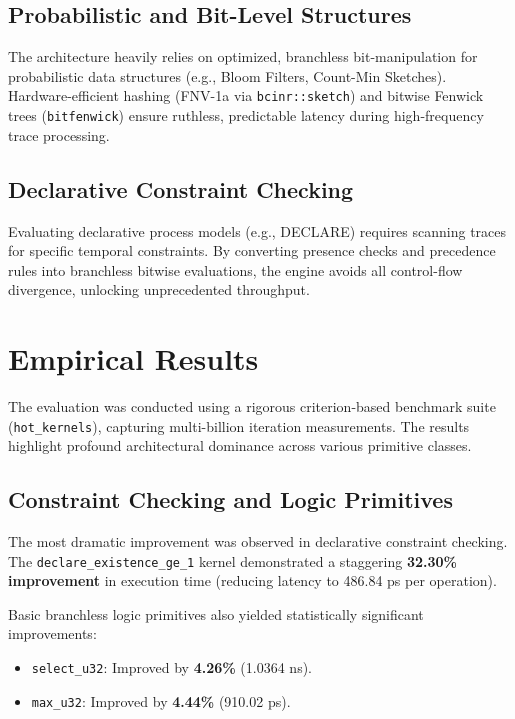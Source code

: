 \documentclass[12pt,a4paper]{report}
\begin{document}
\section{Probabilistic and Bit-Level Structures}
The architecture heavily relies on optimized, branchless bit-manipulation for probabilistic data structures (e.g., Bloom Filters, Count-Min Sketches). Hardware-efficient hashing (FNV-1a via \texttt{bcinr::sketch}) and bitwise Fenwick trees (\texttt{bitfenwick}) ensure ruthless, predictable latency during high-frequency trace processing.

\section{Declarative Constraint Checking}
Evaluating declarative process models (e.g., DECLARE) requires scanning traces for specific temporal constraints. By converting presence checks and precedence rules into branchless bitwise evaluations, the engine avoids all control-flow divergence, unlocking unprecedented throughput.

\chapter{Empirical Results}
The evaluation was conducted using a rigorous criterion-based benchmark suite (\texttt{hot\_kernels}), capturing multi-billion iteration measurements. The results highlight profound architectural dominance across various primitive classes.

\section{Constraint Checking and Logic Primitives}
The most dramatic improvement was observed in declarative constraint checking. The \texttt{declare\_existence\_ge\_1} kernel demonstrated a staggering \textbf{32.30\% improvement} in execution time (reducing latency to 486.84 ps per operation).

Basic branchless logic primitives also yielded statistically significant improvements:
\begin{itemize}
    \item \texttt{select\_u32}: Improved by \textbf{4.26\%} (1.0364 ns).
    \item \texttt{max\_u32}: Improved by \textbf{4.44\%} (910.02 ps).
\end{itemize}
\end{document}
